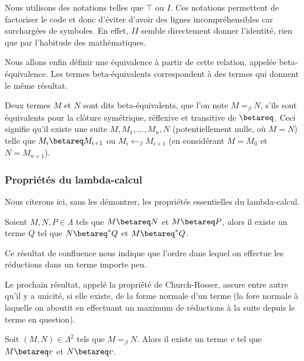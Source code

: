\begin{rmk}
    Nous utilisons des notations telles que $\top$ ou $I$. Ces notations permettent de factoriser le code et donc d'éviter d'avoir des lignes incompréhensibles car surchargées de symboles. En effet, $I I$ semble directement donner l'identité, rien que par l'habitude des mathématiques.
\end{rmk}

Nous allons enfin définir une équivalence à partir de cette relation, appelée beta-équivalence. Les termes beta-équivalents correspondent à des termes qui donnent le même résultat.

\begin{defi}
    Deux termes $M$ et $N$ sont dits beta-équivalents, que l'on note $M=_\beta N$, s'ils sont équivalents pour la clôture symétrique, réflexive et transitive de $\betareq$. Ceci signifie qu'il existe une suite $M,M_1,\ldots,M_n,N$ (potentiellement nulle, où $M=N$) telle que $M_i\betareq M_{i+1}$ ou $M_i \leftarrow_\beta M_{i+1}$ (en considérant $M=M_0$ et $N=M_{n+1}$).
\end{defi}

\subsubsection{Propriétés du lambda-calcul}

Nous citerons ici, sans les démontrer, les propriétés essentielles du lambda-calcul.

\begin{prop}[Confluence]
    Soient $M,N,P\in\Lambda$ tels que $M\betareq N$ et $M\betareq P$, alors il existe un terme $Q$ tel que $N\betareq^* Q$ et $M\betareq^* Q$.
\end{prop}

Ce résultat de confluence nous indique que l'ordre dans lequel on effectue les réductions dans un terme importe peu.

Le prochain résultat, appelé la propriété de Church-Rosser, assure entre autre qu'il y a unicité, si elle existe, de la forme normale d'un terme (la fore normale à laquelle on aboutit en effectuant un maximum de réductions à la suite depuis le terme en question).

\begin{them}
    Soit $(M,N)\in\Lambda^2$ tels que $M=_\beta N$. Alors il existe un terme $v$ tel que $M\betareq v$ et $N\betareq v$.
\end{them}


